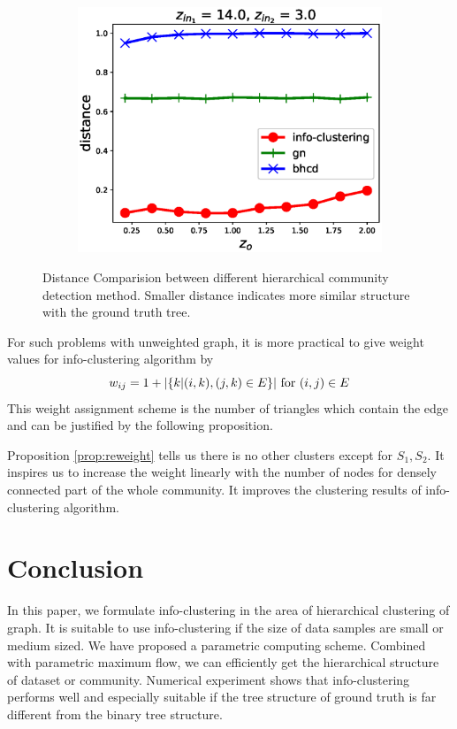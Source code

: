 \documentclass{article}
\begin{document}
\begin{figure}
\begin{subfigure}{0.33\textwidth}
		\includegraphics[width=\textwidth]{pic/z_o.eps}
		\caption{}
	\end{subfigure}
	\caption{Distance Comparision between different hierarchical community detection method. Smaller distance indicates more similar structure with the ground truth tree.}\label{fig:cdr}	
\end{figure}

For such problems with unweighted graph, it is more practical to give weight values for info-clustering algorithm by 
\begin{equation}
    w_{ij} = 1 + \lvert\{k | (i,k),(j,k) \in E \}\rvert \textrm{ for } (i,j) \in E
\end{equation}
This weight assignment scheme is the number of triangles which contain the edge and can be justified by the following proposition.



Proposition \ref{prop:reweight} tells us there is no other clusters except for $S_1, S_2$. It inspires us to increase the weight linearly with the number of nodes for densely connected part of the whole community. It improves the clustering results of info-clustering algorithm.



\section{Conclusion}\label{sec:conclusion}
In this paper, we formulate info-clustering in the area of hierarchical clustering of graph. It is suitable to use info-clustering if the size of data samples are small or medium sized. We have proposed a parametric computing scheme. Combined with parametric maximum flow, we can efficiently get the hierarchical structure of dataset or community. Numerical experiment shows that info-clustering performs well and especially suitable if the tree structure of ground truth is far different from the binary tree structure.






\end{document}
